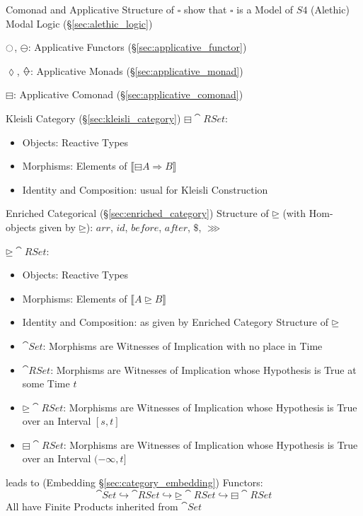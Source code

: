 Comonad and Applicative Structure of $\square$ show that $\square$ is
a Model of $S4$ (Alethic) Modal Logic (\S\ref{sec:alethic_logic})

$\ocircle$, $\ominus$: Applicative Functors
(\S\ref{sec:applicative_functor})

$\lozenge$, $\minlozenge$: Applicative Monads
(\S\ref{sec:applicative_monad})

$\boxminus$: Applicative Comonad (\S\ref{sec:applicative_comonad})

Kleisli Category (\S\ref{sec:kleisli_category}) $\boxminus \cat{RSet}$:
\begin{itemize}
  \item Objects: Reactive Types
  \item Morphisms: Elements of $\llbracket \boxminus A \Rightarrow B
    \rrbracket$
  \item Identity and Composition: usual for Kleisli Construction
\end{itemize}

Enriched Categorical (\S\ref{sec:enriched_category}) Structure of
$\unrhd$ (with Hom-objects given by $\unrhd$): $arr$, $id$, $before$,
$after$, $\$$, $\ggg$

$\unrhd \cat{RSet}$:
\begin{itemize}
  \item Objects: Reactive Types
  \item Morphisms: Elements of $\llbracket A \unrhd B
    \rrbracket$
  \item Identity and Composition: as given by Enriched Category
    Structure of $\unrhd$
\end{itemize}

\begin{itemize}
  \item $\cat{Set}$: Morphisms are Witnesses of Implication with no
    place in Time
  \item $\cat{RSet}$: Morphisms are Witnesses of Implication whose
    Hypothesis is True at some Time $t$
  \item $\unrhd \cat{RSet}$: Morphisms are Witnesses of Implication
    whose Hypothesis is True over an Interval $[s,t]$
  \item $\boxminus \cat{RSet}$: Morphisms are Witnesses of Implication
    whose Hypothesis is True over an Interval $(-\infty,t]$
\end{itemize}
leads to (Embedding \S\ref{sec:category_embedding}) Functors:
\[
  \cat{Set} \hookrightarrow \cat{RSet} \hookrightarrow
    \unrhd\cat{RSet} \hookrightarrow \boxminus\cat{RSet}
\]
All have Finite Products inherited from $\cat{Set}$

